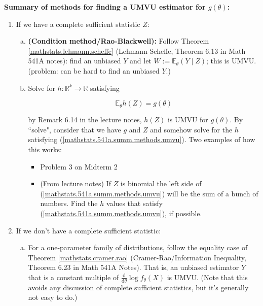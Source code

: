 \documentclass{article}
\newcommand{\deriv}[2]{\frac{\mathrm{d} #1}{\mathrm{d} #2}}
\newcommand{\E}{\mathbb{E}}
\theoremstyle{definition}
\theoremstyle{definition}
\theoremstyle{definition}
\theoremstyle{definition}
\theoremstyle{definition}
\theoremstyle{definition}
\theoremstyle{definition}
\begin{document}
\textbf{Summary of methods for finding a UMVU estimator for \(g(\theta)\):}

\begin{enumerate}[(1)]

\item If we have a complete sufficient statistic \(Z\):

\begin{enumerate}[(a)]

\item \textbf{(Condition method/Rao-Blackwell):} Follow Theorem \ref{mathstats.lehmann.scheffe} (Lehmann-Scheffe, Theorem 6.13 in Math 541A notes): find an unbiased \(Y\) and let \(W:= \E_\theta(Y \mid Z)\); this is UMVU. (problem: can be hard to find an unbiased \(Y\).)

\item Solve for \(h: \mathbb{R}^k \to \mathbb{R}\) satisfying

 \begin{equation}\label{mathstats.541a.summ.methods.umvu}
\E_\theta h(Z) = g(\theta)
\end{equation}

by Remark 6.14 in the lecture notes, \(h(Z)\) is UMVU for \(g(\theta)\). By ``solve", consider that we have \(g\) and \(Z\) and somehow solve for the \(h\) satisfying (\ref{mathstats.541a.summ.methods.umvu}). Two examples of how this works:

\begin{itemize}

\item Problem 3 on Midterm 2

\item (From lecture notes) If \(Z\) is binomial the left side of (\ref{mathstats.541a.summ.methods.umvu}) will be the sum of a bunch of numbers. Find the \(h\) values that satisfy (\ref{mathstats.541a.summ.methods.umvu}), if possible.

\end{itemize}

\end{enumerate}

\item If we don't have a complete sufficient statistic:

\begin{enumerate}[(a)]

\item For a one-parameter family of distributions, follow the equality case of Theorem \ref{mathstats.cramer.rao} (Cramer-Rao/Information Inequality, Theorem 6.23 in Math 541A Notes). That is, an unbiased estimator \(Y\) that is a constant multiple of \(\deriv{}{\theta}  \log f_\theta (X) \) is UMVU. (Note that this avoids any discussion of complete sufficient statistics, but it's generally not easy to do.)


\end{enumerate}
\end{enumerate}
\end{document}
